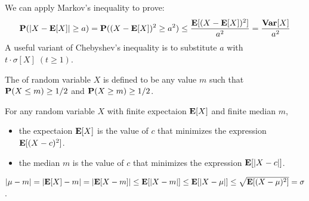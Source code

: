 \documentclass[main.tex]{subfiles}
\begin{document}
\begin{pf}
	We can apply Markov's inequality to prove:
	\[
		\mathbf{P}(|X-\mathbf{E}[X]|\ge a)=\mathbf{P}((X-\mathbf{E}[X])^2\ge a^2)\le\frac{\mathbf{E}[(X-\mathbf{E}[X])^2]}{a^2}=\frac{\mathbf{Var}[X]}{a^2}
	\]
	A useful variant of Chebyshev’s inequality is to substitute $a$ with $t\cdot\sigma[X]\;(t\ge 1)$.
\end{pf}

The  of random variable $X$ is defined to be any value $m$ such that $\mathbf{P}(X\le m)\ge 1/2$ and $\mathbf{P}(X\ge m)\ge 1/2$.

\begin{theorem}
	For any random variable $X$ with finite expectaion $\mathbf{E}[X]$ and finite median $m$,
	\begin{itemize}
		\item the expectaion $\mathbf{E}[X]$ is the value of $c$ that minimizes the expression $\mathbf{E}[(X-c)^2]$.
		\item the median $m$ is the value of $c$ that minimizes the expression $\mathbf{E}[\lvert X-c \rvert]$.
	\end{itemize}
\end{theorem}

\begin{corollary}
	$\lvert \mu-m\rvert = \lvert \mathbf{E}[X]-m\rvert = \lvert\mathbf{E}[X-m]\rvert \le \mathbf{E}[\lvert X-m\rvert]\le \mathbf{E}[\lvert X-\mu\rvert]\le \sqrt{\mathbf{E}[(X-\mu)^2]}=\sigma$.
\end{corollary}
\end{document}
